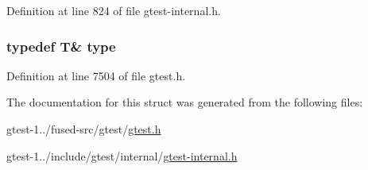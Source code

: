 \-Definition at line 824 of file gtest-\/internal.\-h.

\hypertarget{structtesting_1_1internal_1_1AddReference_3_01T_01_6_01_4_a08e05528fbb401bd8299a21d67d13ee3}{
\subsubsection[{type}]{\setlength{\rightskip}{0pt plus 5cm}typedef \-T\& {\bf type}}}\label{dc/d2d/structtesting_1_1internal_1_1AddReference_3_01T_01_6_01_4_a08e05528fbb401bd8299a21d67d13ee3}


\-Definition at line 7504 of file gtest.\-h.



\-The documentation for this struct was generated from the following files\-:\begin{DoxyCompactItemize}
\item 
gtest-\/1../fused-\/src/gtest/\hyperlink{fused-src_2gtest_2gtest_8h}{gtest.\-h}\item 
gtest-\/1../include/gtest/internal/\hyperlink{gtest-internal_8h}{gtest-\/internal.\-h}\end{DoxyCompactItemize}
